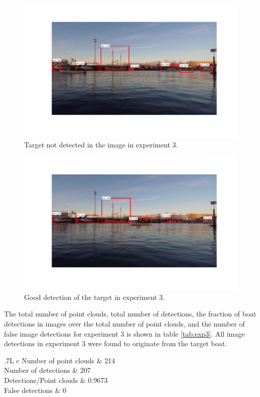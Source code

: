 \begin{figure}[H]
	\centering
	\includegraphics[width=\linewidth]{fig/ex3_miss.png}
	\caption{Target not detected in the image in experiment 3.}
	\label{fig:issues_ex3}
\end{figure}%
\begin{figure}[H]
	\centering
	\includegraphics[width=\linewidth]{fig/ex3_hit.png}
	\caption{Good detection of the target in experiment 3.}
	\label{fig:hit_ex3}
\end{figure}%
The total number of point clouds, total number of detections, the fraction of boat detections in images over the total number of point clouds, and the number of false image detections for experiment 3 is shown in table \ref{tab:exp3}. All image detections in experiment 3 were found to originate from the target boat.
\begin{table}[h]
	\centering
	\begin{tabularx}{.7\linewidth}{L c}
		\toprule
		Number of point clouds & 214\\
		\midrule
		Number of detections & 207\\
		\midrule
		Detections/Point clouds & 0.9673 \\
		\midrule
		False detections & 0\\
		\bottomrule
	\end{tabularx}
	\caption{Data from experiment 3.}
	\label{tab:exp3}
\end{table}
